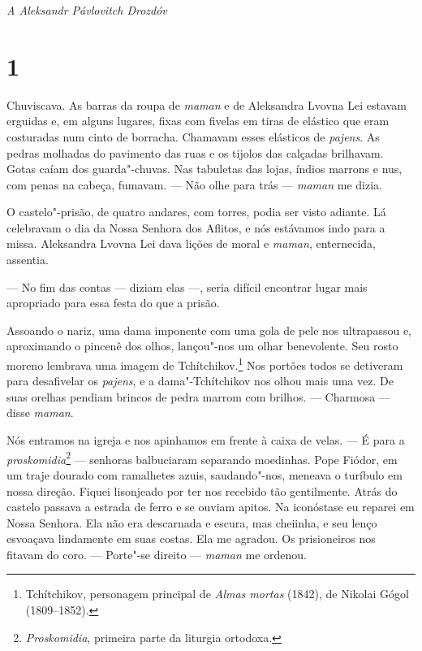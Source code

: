 \blankpage

\pagebreak
\thispagestyle{empty}


\begin{vplace}[.8]
\begin{center}
{}
\end{center}
\end{vplace}

\pagebreak

\begin{vplace}[30]
\begin{flushright}
\emph{A Aleksandr Pávlovitch Drozdóv}
\end{flushright}
\end{vplace}
\thispagestyle{empty}


\section{1} \label{cidade}

Chuviscava. As barras da roupa de \emph{maman} e de Aleksandra Lvovna
Lei estavam erguidas e, em alguns lugares, fixas com fivelas em tiras de
elástico que eram costuradas num cinto de borracha. Chamavam esses
elásticos de \emph{pajens}. As pedras molhadas do pavimento das ruas e
os tijolos das calçadas brilhavam. Gotas caíam dos guarda"-chuvas. Nas
tabuletas das lojas, índios marrons e nus, com penas na cabeça, fumavam.
--- Não olhe para trás --- \emph{maman} me dizia.

O castelo"-prisão, de quatro andares, com torres, podia ser visto
adiante. Lá celebravam o dia da Nossa Senhora dos Aflitos, e nós
estávamos indo para a missa. Aleksandra Lvovna Lei dava lições de moral
e \emph{maman}, enternecida, assentia.

--- No fim das contas --- diziam elas ---, seria difícil encontrar lugar
mais apropriado para essa festa do que a prisão.

Assoando o nariz, uma dama imponente com uma gola de pele nos
ultrapassou e, aproximando o pincenê dos olhos, lançou"-nos um olhar
benevolente. Seu rosto moreno lembrava uma imagem de
Tchítchikov.\footnote{Tchítchikov, personagem principal de \emph{Almas
  mortas} (1842), de Nikolai Gógol (1809--1852).} Nos portões
todos se detiveram para desafivelar os \emph{pajens}, e a
dama"-Tchítchikov nos olhou mais uma vez. De suas orelhas pendiam brincos
de pedra marrom com brilhos. --- Charmosa --- disse \emph{maman}.

Nós entramos na igreja e nos apinhamos em frente à caixa de velas. --- É
para a \emph{proskomidia}\footnote{\emph{Proskomidia}, primeira parte da
  liturgia ortodoxa.} --- senhoras balbuciaram separando moedinhas. Pope
Fiódor, em um traje dourado com ramalhetes azuis, saudando"-nos, meneava
o turíbulo em nossa direção. Fiquei lisonjeado por ter nos recebido tão
gentilmente. Atrás do castelo passava a estrada de ferro e se ouviam
apitos. Na iconóstase eu reparei em Nossa Senhora. Ela não era
descarnada e escura, mas cheiinha, e seu lenço esvoaçava lindamente em
suas costas. Ela me agradou. Os prisioneiros nos fitavam do coro. ---
Porte"-se direito --- \emph{maman} me ordenou.

